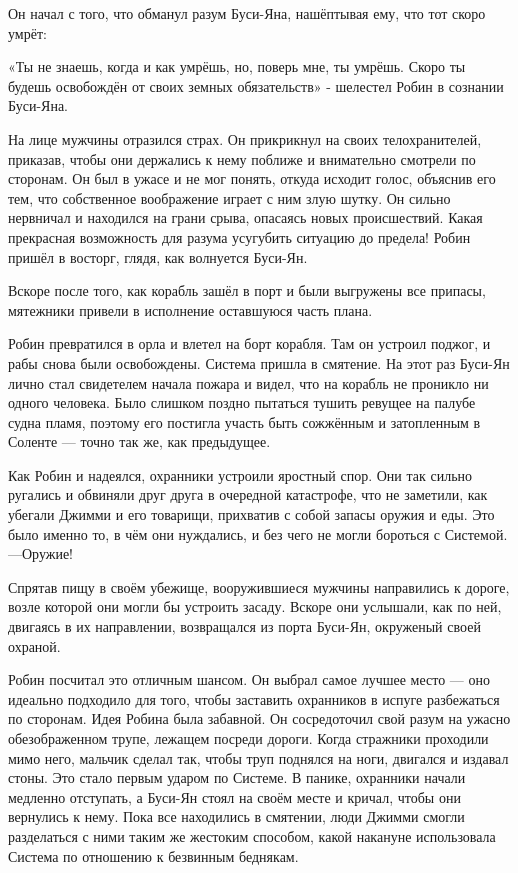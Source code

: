 \documentclass[a4paper,12pt]{book}
\begin{document}
\par
Он начал с того, что обманул разум Буси-Яна, нашёптывая ему, что тот скоро умрёт:
\par
«Ты не знаешь, когда и как умрёшь, но, поверь мне, ты умрёшь. Скоро ты будешь освобождён от своих земных обязательств» - шелестел Робин в сознании Буси-Яна.
\par
На лице мужчины отразился страх. Он прикрикнул на своих телохранителей, приказав, чтобы они держались к нему поближе и внимательно смотрели по сторонам. Он был в ужасе и не мог понять, откуда исходит голос, объяснив его тем, что собственное воображение играет с ним злую шутку. Он сильно нервничал и находился на грани срыва, опасаясь новых происшествий. Какая прекрасная возможность для разума усугубить ситуацию до предела! Робин пришёл в восторг, глядя, как волнуется Буси-Ян.
\par
Вскоре после того, как корабль зашёл в порт и были выгружены все припасы, мятежники привели в исполнение оставшуюся часть плана.\\
\par
Робин превратился в орла и влетел на борт корабля. Там он устроил поджог, и рабы снова были освобождены. Система пришла в смятение. На этот раз Буси-Ян лично стал свидетелем начала пожара и видел, что на корабль не проникло ни одного человека. Было слишком поздно пытаться тушить ревущее на палубе судна пламя, поэтому его постигла участь быть сожжённым и затопленным в Соленте — точно так же, как предыдущее.
\par
Как Робин и надеялся, охранники устроили яростный спор. Они так сильно ругались и обвиняли друг друга в очередной катастрофе, что не заметили, как убегали Джимми и его товарищи, прихватив с собой запасы оружия и еды. Это было именно то, в чём они нуждались, и без чего не могли бороться с Системой. —Оружие!
\par
Спрятав пищу в своём убежище, вооружившиеся мужчины направились к дороге, возле которой они могли бы устроить засаду. Вскоре они услышали, как по ней, двигаясь в их направлении, возвращался из порта Буси-Ян, окруженый своей охраной.\\
\par
Робин посчитал это отличным шансом. Он выбрал самое лучшее место — оно идеально подходило для того, чтобы заставить охранников в испуге разбежаться по сторонам. Идея Робина была забавной. Он сосредоточил свой разум на ужасно обезображенном трупе, лежащем посреди дороги. Когда стражники проходили мимо него, мальчик сделал так, чтобы труп поднялся на ноги, двигался и издавал стоны. Это стало первым ударом по Системе. В панике, охранники начали медленно отступать, а Буси-Ян стоял на своём месте и кричал, чтобы они вернулись к нему. Пока все находились в смятении, люди Джимми смогли разделаться с ними таким же жестоким способом, какой накануне использовала Система по отношению к безвинным беднякам.
\end{document}
